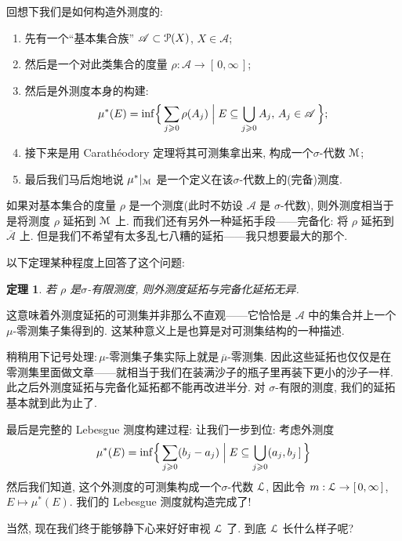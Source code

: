 \documentclass[twoside, fontset=fandol]{ctexart}
\let \mathcal \EuScript
\theoremstyle{innocent}
\newtheorem*{theorem}{定理}
\begin{document}
回想下我们是如何构造外测度的:
\begin{enumerate}
    \item 先有一个``基本集合族'' $\mathscr A\subset\mathcal P(X)$, $X\in\mathscr A$;
    \item 然后是一个对此类集合的度量 $\rho :\mathscr A\to [\,0,\infty\,]$;
    \item 然后是外测度本身的构建: \[\mu^*(E) = \inf\Bigl\{ \,\sum_{j\geqslant 0}\rho (A_j)\Bigm| E\subseteq\bigcup_{j\geqslant 0}A_j,\,A_j\in\mathscr A\, \Bigr\};\]
    \item 接下来是用 Carathéodory 定理将其可测集拿出来, 构成一个\;$\sigma $-代数 $\mathcal M$;
    \item 最后我们马后炮地说 $\mu^*|_{\mathcal M}$ 是一个定义在该\;$\sigma $-代数上的(完备)测度.
\end{enumerate}
如果对基本集合的度量 $\rho $ 是一个测度(此时不妨设 $\mathscr A$ 是 $\sigma$-代数), 则外测度相当于是将测度 $\rho$ 延拓到 $\mathcal M$ 上. 而我们还有另外一种延拓手段------完备化: 将 $\rho $ 延拓到 $\overline{\mathscr A}$ 上. 但是我们不希望有太多乱七八糟的延拓------我只想要最大的那个.

以下定理某种程度上回答了这个问题:
\begin{theorem}
    若 $\rho $ 是\;$\sigma $-有限测度, 则外测度延拓与完备化延拓无异.
\end{theorem}
这意味着外测度延拓的可测集并非那么不直观------它恰恰是 $\mathscr A$ 中的集合并上一个\;$\mu $-零测集子集得到的. 这某种意义上是也算是对可测集结构的一种描述.

稍稍用下记号处理:\,\;$\mu $-零测集子集实际上就是\,$\overline{\mu }$-零测集. 因此这些延拓也仅仅是在零测集里面做文章------就相当于我们在装满沙子的瓶子里再装下更小的沙子一样. 此之后外测度延拓与完备化延拓都不能再改进半分. 对 $\sigma$-有限的测度, 我们的延拓基本就到此为止了.

最后是完整的 Lebesgue 测度构建过程: 让我们一步到位: 考虑外测度
\[
    \mu ^*(E) = \inf\Bigl\{ \,\sum_{j\geqslant 0}(b_j-a_j)\Bigm| E\subseteq\bigcup_{j\geqslant 0}(a_j,b_j\,]\, \Bigr\}
\]
然后我们知道, 这个外测度的可测集构成一个\;$\sigma $-代数 $\mathcal L$, 因此令 $m:\mathcal L\to [\,0,\infty\,]$, $E\mapsto \mu ^*(E)$. 我们的 Lebesgue 测度就构造完成了!

当然, 现在我们终于能够静下心来好好审视 $\mathcal L$ 了. 到底 $\mathcal L$ 长什么样子呢?
\end{document}
